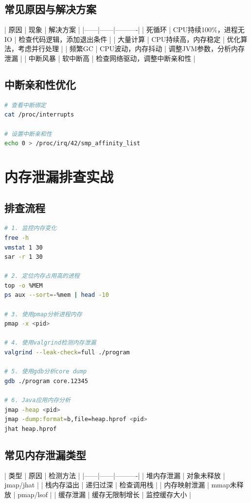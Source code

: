 \documentclass[12pt,UTF8]{ctexbook}
\begin{document}
\subsection*{常见原因与解决方案}

| 原因 | 现象 | 解决方案 |
|------|------|----------|
| 死循环 | CPU持续100\%，进程无IO | 检查代码逻辑，添加退出条件 |
| 大量计算 | CPU持续高，内存稳定 | 优化算法，考虑并行处理 |
| 频繁GC | CPU波动，内存抖动 | 调整JVM参数，分析内存泄漏 |
| 中断风暴 | 软中断高 | 检查网络驱动，调整中断亲和性 |

\subsection*{中断亲和性优化}

\begin{lstlisting}[language=bash]
# 查看中断绑定
cat /proc/interrupts

# 设置中断亲和性
echo 0 > /proc/irq/42/smp_affinity_list
\end{lstlisting}

\section{内存泄漏排查实战}
\label{sec:memory-leak}

\subsection*{排查流程}

\begin{lstlisting}[language=bash]
# 1. 监控内存变化
free -h
vmstat 1 30
sar -r 1 30

# 2. 定位内存占用高的进程
top -o %MEM
ps aux --sort=-%mem | head -10

# 3. 使用pmap分析进程内存
pmap -x <pid>

# 4. 使用valgrind检测内存泄漏
valgrind --leak-check=full ./program

# 5. 使用gdb分析core dump
gdb ./program core.12345

# 6. Java应用内存分析
jmap -heap <pid>
jmap -dump:format=b,file=heap.hprof <pid>
jhat heap.hprof
\end{lstlisting}

\subsection*{常见内存泄漏类型}

| 类型 | 原因 | 检测方法 |
|------|------|----------|
| 堆内存泄漏 | 对象未释放 | jmap/jhat |
| 栈内存溢出 | 递归过深 | 检查调用栈 |
| 内存映射泄漏 | mmap未释放 | pmap/lsof |
| 缓存泄漏 | 缓存无限制增长 | 监控缓存大小 |
\end{document}
